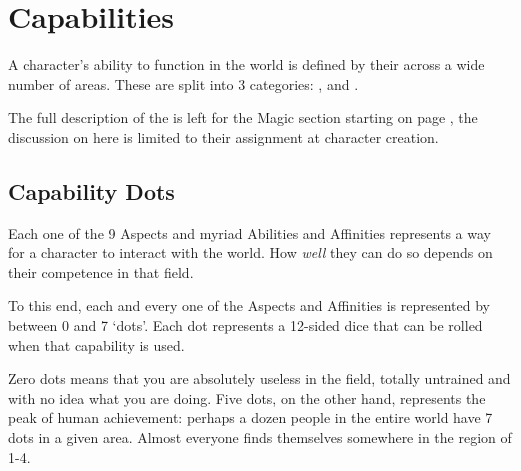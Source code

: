 
\newcommand\abilityRow[3]
{
	\index{Abilities!#3!#1}
	\index{#1|see{Abilities, #3 (#1)}}\imp{#1} & \parbox[t]{6.8 cm}{\raggedright #2} \\
}

\newcommand\abilityTable[1]
{
	\small
	\begin{center}
		\begin{rndtable}{r l}
		\bf Ability	& \bf Description \\
		#1
		\end{rndtable}
	\end{center}
}
\def\cc{\cellcolor{\tablecolorhead}\bf}
\newcommand\fourRow[4]{{\cc \bf \key{#1}}	&	\imp{#2}	&	\imp{#3}	&	\imp{#4} \\}



\chapter{Capabilities}\label{C:Aspects}

A character's ability to function in the world is defined by their  across a wide number of areas. These  are split into 3 categories: ,  and . 

The full description of the  is left for the Magic section starting on page \pageref{C:Magic}, the discussion on  here is limited to their assignment at character creation. 

\section{Capability Dots}

Each one of the 9 Aspects and myriad Abilities and Affinities represents a way for a character to interact with the world. How {\it well} they can do so depends on their competence in that field. 

To this end, each and every one of the Aspects and Affinities is represented by between 0 and 7 `dots'. Each dot represents a 12-sided dice that can be rolled when that capability is used. 

Zero dots means that you are absolutely useless in the field, totally untrained and with no idea what you are doing. Five dots, on the other hand, represents the peak of human achievement: perhaps a dozen people in the entire world have 7 dots in a given area. Almost everyone finds themselves somewhere in the region of 1-4. 

